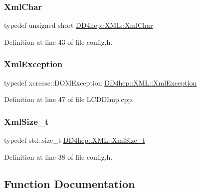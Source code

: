 \subsubsection{\texorpdfstring{Xml\+Char}{XmlChar}}
{\footnotesize\ttfamily typedef unsigned short \hyperlink{namespace_d_d4hep_1_1_x_m_l_a09e5d9cc86ed782f6826dfe0778c1815}{D\+D4hep\+::\+X\+M\+L\+::\+Xml\+Char}}



Definition at line 43 of file config.\+h.

\hypertarget{namespace_d_d4hep_1_1_x_m_l_a60be75f70ac155f3f1a92aa1c69f085b}{}\label{namespace_d_d4hep_1_1_x_m_l_a60be75f70ac155f3f1a92aa1c69f085b} 
\subsubsection{\texorpdfstring{Xml\+Exception}{XmlException}}
{\footnotesize\ttfamily typedef xercesc\+::\+D\+O\+M\+Exception \hyperlink{namespace_d_d4hep_1_1_x_m_l_a60be75f70ac155f3f1a92aa1c69f085b}{D\+D4hep\+::\+X\+M\+L\+::\+Xml\+Exception}}



Definition at line 47 of file L\+C\+D\+D\+Imp.\+cpp.

\hypertarget{namespace_d_d4hep_1_1_x_m_l_a0509adb4703e562548dcd1df5301f38d}{}\label{namespace_d_d4hep_1_1_x_m_l_a0509adb4703e562548dcd1df5301f38d} 
\subsubsection{\texorpdfstring{Xml\+Size\+\_\+t}{XmlSize\_t}}
{\footnotesize\ttfamily typedef std\+::size\+\_\+t \hyperlink{namespace_d_d4hep_1_1_x_m_l_a0509adb4703e562548dcd1df5301f38d}{D\+D4hep\+::\+X\+M\+L\+::\+Xml\+Size\+\_\+t}}



Definition at line 38 of file config.\+h.



\subsection{Function Documentation}
\hypertarget{namespace_d_d4hep_1_1_x_m_l_a242bb35f6c983f400a35ef28e873267a}{}\label{namespace_d_d4hep_1_1_x_m_l_a242bb35f6c983f400a35ef28e873267a} 

